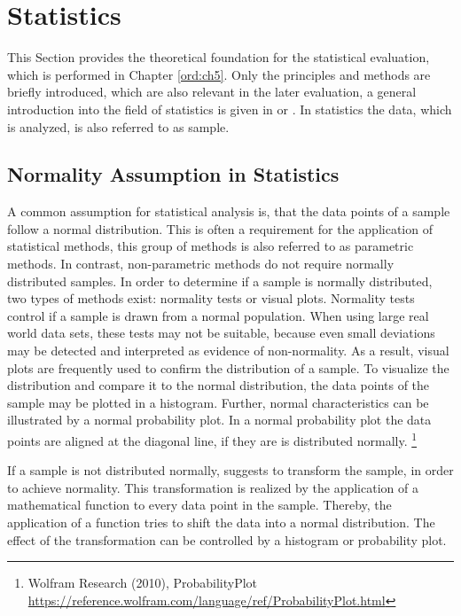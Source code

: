 
\section{Statistics}\label{ord:ch2:sec4}

This Section provides the theoretical foundation for the statistical evaluation, which is performed in Chapter \ref{ord:ch5}.
Only the principles and methods are briefly introduced, which are also relevant in the later evaluation, a general introduction into the field of statistics is given in \cite{PS16-Statistics} or \cite{Dodge08-Statistics}.
In statistics the data, which is analyzed, is also referred to as sample.


\subsection{Normality Assumption in Statistics} \label{ord:ch2:sec4:subsec1}
A common assumption for statistical analysis is, that the data points of a sample follow a normal distribution.
This is often a requirement for the application of statistical methods, this group of methods is also referred to as parametric methods.
In contrast, non-parametric methods do not require normally distributed samples.
In order to determine if a sample is normally distributed, two types of methods exist: normality tests or visual plots.
Normality tests control if a sample is drawn from a normal population.
When using large real world data sets, these tests may not be suitable, because even small deviations may be detected and interpreted as evidence of non-normality.
As a result, visual plots are frequently used to confirm the distribution of a sample.
To visualize the distribution and compare it to the normal distribution, the data points of the sample may be plotted in a histogram.
Further, normal characteristics can be illustrated by a normal probability plot.
In a normal probability plot the data points are aligned at the diagonal line, if they are is distributed normally. \footnote{Wolfram Research (2010), ProbabilityPlot \url{https://reference.wolfram.com/language/ref/ProbabilityPlot.html}}

If a sample is not distributed normally, \cite{PS16-Statistics} suggests to transform the sample, in order to achieve normality.
This transformation is realized by the application of a mathematical function to every data point in the sample.
Thereby, the application of a function tries to shift the data into a normal distribution.
The effect of the transformation can be controlled by a histogram or probability plot.


